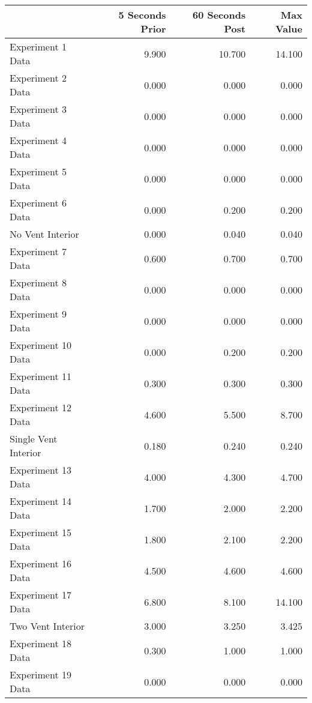 \begin{tabular}{lrrr}
\toprule
{} &  5 Seconds Prior &  60 Seconds Post &  Max Value \\
\midrule
Experiment 1 Data    &            9.900 &           10.700 &     14.100 \\
Experiment 2 Data    &            0.000 &            0.000 &      0.000 \\
Experiment 3 Data    &            0.000 &            0.000 &      0.000 \\
Experiment 4 Data    &            0.000 &            0.000 &      0.000 \\
Experiment 5 Data    &            0.000 &            0.000 &      0.000 \\
Experiment 6 Data    &            0.000 &            0.200 &      0.200 \\
No Vent Interior     &            0.000 &            0.040 &      0.040 \\
Experiment 7 Data    &            0.600 &            0.700 &      0.700 \\
Experiment 8 Data    &            0.000 &            0.000 &      0.000 \\
Experiment 9 Data    &            0.000 &            0.000 &      0.000 \\
Experiment 10 Data   &            0.000 &            0.200 &      0.200 \\
Experiment 11 Data   &            0.300 &            0.300 &      0.300 \\
Experiment 12 Data   &            4.600 &            5.500 &      8.700 \\
Single Vent Interior &            0.180 &            0.240 &      0.240 \\
Experiment 13 Data   &            4.000 &            4.300 &      4.700 \\
Experiment 14 Data   &            1.700 &            2.000 &      2.200 \\
Experiment 15 Data   &            1.800 &            2.100 &      2.200 \\
Experiment 16 Data   &            4.500 &            4.600 &      4.600 \\
Experiment 17 Data   &            6.800 &            8.100 &     14.100 \\
Two Vent Interior    &            3.000 &            3.250 &      3.425 \\
Experiment 18 Data   &            0.300 &            1.000 &      1.000 \\
Experiment 19 Data   &            0.000 &            0.000 &      0.000 \\

\end{tabular}
